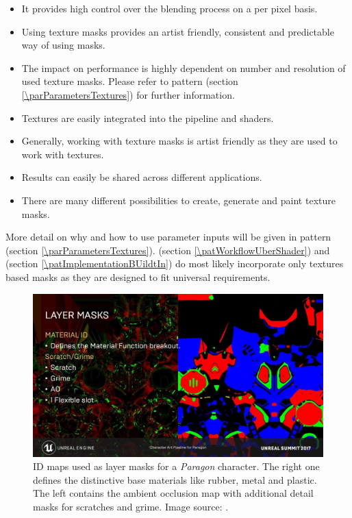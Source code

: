 \begin{description}
\begin{description}
			\begin{itemize}\mynobreakpar
				\item It provides high control over the blending process on a per pixel basis.
				\item Using texture masks provides an artist friendly, consistent and predictable way of using masks. 
			\end{itemize}
			\item[\performance:]\hfill
			\begin{itemize}\mynobreakpar
				\item The impact on performance is highly dependent on number and resolution of used texture masks. Please refer to pattern \emph{\parParametersTextures} (section \ref{\parParametersTextures}) for further information.
			\end{itemize}
			\item[\pipeline:]\hfill
			\begin{itemize}\mynobreakpar
				\item Textures are easily integrated into the pipeline and shaders. 
				\item Generally, working with texture masks is artist friendly as they are used to work with textures. 
				\item Results can easily be shared across different applications.
				\item There are many different possibilities to create, generate and paint texture masks. 
			\end{itemize}
		\end{description}
	\item[\patRelations:]%
	More detail on why and how to use parameter inputs will be given in pattern \emph{\parParametersTextures} (section \ref{\parParametersTextures}). \emph{\patWorkflowUberShader} (section \ref{\patWorkflowUberShader}) and \emph{\patImplementationBUildtIn} (section \ref{\patImplementationBUildtIn}) do most likely incorporate only textures based masks as they are designed to fit universal requirements. 
\end{description}

\begin{figure} 
	\centering
	\includegraphics[width=0.7\linewidth]{images/07cha_19_ue4Presentation.jpg}
	\caption{ID maps used as layer masks for a \emph{Paragon} character. The right one defines the distinctive base materials like rubber, metal and plastic. The left contains the ambient occlusion map with additional detail masks for scratches and grime. Image source: \cite[p.\,116]{kime2017paragonsummit}.}
	\label{fig:paragonMasksSlide}
\end{figure}

